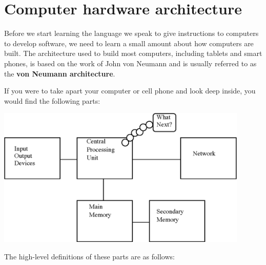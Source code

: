 \section{Computer hardware architecture}

Before we start learning the language we 
speak to give instructions to computers to 
develop software, we need to learn a small amount about 
how computers are built. The architecture used to build
most computers, including tablets and smart phones, is
based on the work of John von Neumann and is usually
referred to as the {\bf von Neumann architecture}.

If you were to take
apart your computer or cell phone and look deep
inside, you would find the following parts:

\beforefig
\centerline{\includegraphics[width=0.9\textwidth]{figs2/archNoSoftware.eps}}
\afterfig

The high-level definitions of these parts are as follows:

